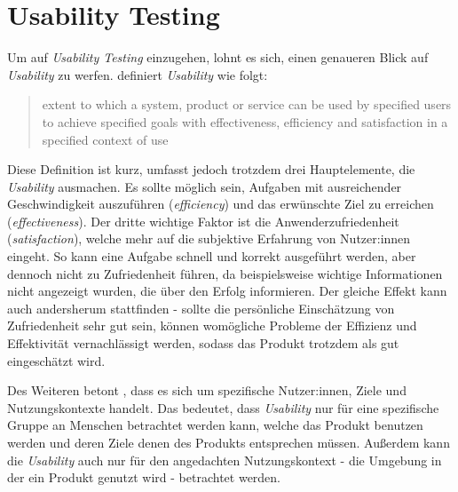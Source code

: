 \section{Usability Testing}

Um auf \textit{Usability Testing} einzugehen, lohnt es sich, einen genaueren Blick auf
\textit{Usability} zu werfen.  definiert \textit{Usability} wie
folgt:
\begin{quote}
  extent to which a system, product or service can be used by specified users to achieve specified
  goals with effectiveness, efficiency and satisfaction in a specified context of use

  \hspace*{\fill{}}
\end{quote}
Diese Definition ist kurz, umfasst jedoch trotzdem drei Hauptelemente, die \textit{Usability}
ausmachen. Es sollte möglich sein, Aufgaben mit ausreichender Geschwindigkeit auszuführen
(\textit{efficiency}) und das erwünschte Ziel zu erreichen (\textit{effectiveness}). Der dritte
wichtige Faktor ist die Anwenderzufriedenheit (\textit{satisfaction}), welche mehr auf die
subjektive Erfahrung von Nutzer:innen eingeht. So kann eine Aufgabe schnell und korrekt ausgeführt
werden, aber dennoch nicht zu Zufriedenheit führen, da beispielsweise wichtige Informationen nicht
angezeigt wurden, die über den Erfolg informieren. Der gleiche Effekt kann auch andersherum
stattfinden - sollte die persönliche Einschätzung von Zufriedenheit sehr gut sein, können womögliche
Probleme der Effizienz und Effektivität vernachlässigt werden, sodass das Produkt trotzdem als gut
eingeschätzt wird. \parencite{barnumUsabilityTesting2021}

Des Weiteren betont \citeauthor{barnumUsabilityTesting2021} \cite{barnumUsabilityTesting2021}, dass
es sich um spezifische Nutzer:innen, Ziele und Nutzungskontexte handelt. Das bedeutet, dass
\textit{Usability} nur für eine spezifische Gruppe an Menschen betrachtet werden kann, welche das
Produkt benutzen werden und deren Ziele denen des Produkts entsprechen müssen. Außerdem kann die
\textit{Usability} auch nur für den angedachten Nutzungskontext - die Umgebung in der ein Produkt
genutzt wird - betrachtet werden. \parencite{barnumUsabilityTesting2021}

